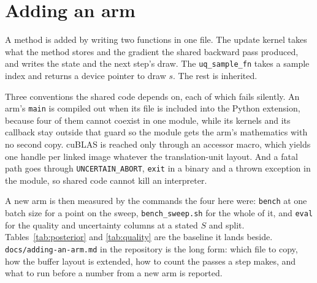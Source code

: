 \section{Adding an arm}
\label{sec:adding}


A method is added by writing two functions in one file. The update kernel takes what
the method stores and the gradient the shared backward pass produced, and writes the
state and the next step's draw. The \texttt{uq\_sample\_fn} takes a sample index and
returns a device pointer to draw $s$. The rest is inherited.

Three conventions the shared code depends on, each of which fails silently. An arm's
\texttt{main} is compiled out when its file is included into the Python extension,
because four of them cannot coexist in one module, while its kernels and its callback
stay outside that guard so the module gets the arm's mathematics with no second copy.
cuBLAS is reached only through an accessor macro, which yields one handle per linked
image whatever the translation-unit layout. And a fatal path goes through
\texttt{UNCERTAIN\_ABORT}, \texttt{exit} in a binary and a thrown exception in the
module, so shared code cannot kill an interpreter.

A new arm is then measured by the commands the four here were: \texttt{bench} at one
batch size for a point on the sweep, \texttt{bench\_sweep.sh} for the whole of it, and
\texttt{eval} for the quality and uncertainty columns at a stated $S$ and split.
Tables~\ref{tab:posterior} and \ref{tab:quality} are the baseline it lands beside.
\texttt{docs/adding-an-arm.md} in the repository is the long form: which file to copy,
how the buffer layout is extended, how to count the passes a step makes, and what to
run before a number from a new arm is reported.
